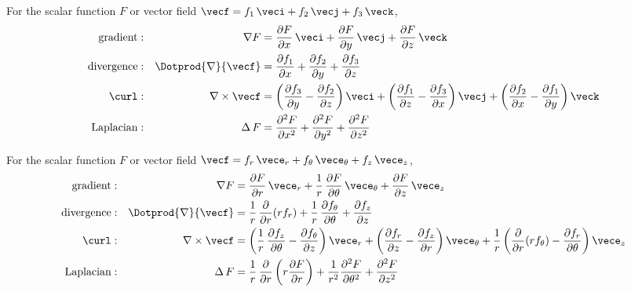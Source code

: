 {
\begin{keyidea}\label{ki_cart_sys}
For the scalar function $F$ or vector field $\vecf = f_1\,\veci + f_2\,\vecj + f_3\,\veck$,
 \begin{alignat*}{2}
  \text{gradient} &: & \nabla F
  &= \frac{\partial F}{\partial x}\,\veci + \frac{\partial F}{\partial y}\,\vecj
   + \frac{\partial F}{\partial z}\,\veck\\
  \text{divergence} &: & \Dotprod{\nabla}{\vecf}
  &= \frac{\partial f_1}{\partial x} +
   \frac{\partial f_2}{\partial y} + \frac{\partial f_3}{\partial z}\\
  \curl &:  & \nabla\times\vecf
  &=
   \left( \frac{\partial f_3}{\partial y} - \frac{\partial f_2}{\partial z} \right) \veci +
   \left( \frac{\partial f_1}{\partial z} - \frac{\partial f_3}{\partial x} \right) \vecj +
   \left( \frac{\partial f_2}{\partial x} - \frac{\partial f_1}{\partial y} \right) \veck\\
  \text{Laplacian} &: & \Delta\,F
  &= \frac{\partial^2 F}{\partial x^2} +
   \frac{\partial^2 F}{\partial y^2} + \frac{\partial^2 F}{\partial z^2}
 \end{alignat*}
\end{keyidea}

{
\begin{keyidea}\label{ki_cyl_sys}
For the scalar function $F$ or vector field $\vecf = f_{r}\,\vece_{r} + f_{\theta}\,\vece_{\theta} + f_{z}\,\vece_{z}$,
 \begin{alignat*}{2}
  \text{gradient} &: & \nabla F &= \frac{\partial F}{\partial r}\,\vece_{r} +
   \frac{1}{r}\,\frac{\partial F}{\partial \theta}\,\vece_{\theta} + \frac{\partial F}{\partial z}\,\vece_{z}\\
  \text{divergence} &: & \Dotprod{\nabla}{\vecf} &= \frac{1}{r}\,\frac{\partial}{\partial r}(rf_{r}) +
   \frac{1}{r}\,\frac{\partial f_{\theta}}{\partial \theta} + \frac{\partial f_{z}}{\partial z}\\
  \curl &:  & \nabla\times\vecf &=
   \left( \frac{1}{r}\,\frac{\partial f_{z}}{\partial \theta} - \frac{\partial f_{\theta}}{\partial z} \right)
   \vece_{r} +
   \left( \frac{\partial f_{r}}{\partial z} - \frac{\partial f_{z}}{\partial r} \right) \vece_{\theta} +
   \frac{1}{r} \left( \frac{\partial}{\partial r}(rf_{\theta}) - \frac{\partial f_{r}}{\partial \theta}
   \right) \vece_{z}\\
  \text{Laplacian} &: & \Delta\,F &= \frac{1}{r}\,\frac{\partial}{\partial r} \left( r\frac{\partial F}{\partial r}
   \right) + \frac{1}{r^2}\frac{\partial^2 F}{\partial \theta^2} + \frac{\partial^2 F}{\partial z^2}
 \end{alignat*}
\end{keyidea}
}

}
